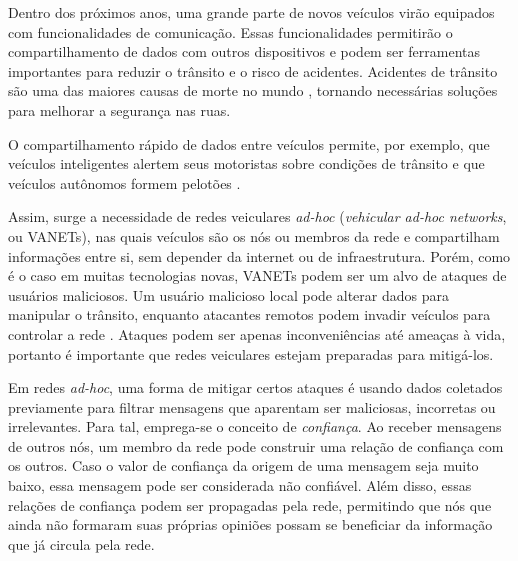 \begin{resumoextendido}
%	
%	
	
	Dentro dos próximos anos, uma grande parte de novos veículos virão equipados com funcionalidades de comunicação.
	Essas funcionalidades permitirão o compartilhamento de dados com outros dispositivos e podem ser ferramentas importantes para reduzir o trânsito e o risco de acidentes.
	Acidentes de trânsito são uma das maiores causas de morte no mundo \citep{whofactsheet}, tornando necessárias soluções para melhorar a segurança nas ruas.
	
	O compartilhamento rápido de dados entre veículos permite, por exemplo, que veículos inteligentes alertem seus motoristas sobre condições de trânsito \citep{lee2004collision} e que veículos autônomos formem pelotões \citep{amoozadeh2015platoon}.
	
	Assim, surge a necessidade de redes veiculares \textit{ad-hoc} (\textit{vehicular ad-hoc networks}, ou VANETs), nas quais veículos são os nós ou membros da rede e compartilham informações entre si, sem depender da internet ou de infraestrutura.	
	Porém, como é o caso em muitas tecnologias novas, VANETs podem ser um alvo de ataques de usuários maliciosos.
	Um usuário malicioso local pode alterar dados para manipular o trânsito, enquanto atacantes remotos podem invadir veículos para controlar a rede \citep{garip2015congestion}.
	Ataques podem ser apenas inconveniências até ameaças à vida, portanto é importante que redes veiculares estejam preparadas para mitigá-los.

	Em redes \textit{ad-hoc}, uma forma de mitigar certos ataques é usando dados coletados previamente para filtrar mensagens que aparentam ser maliciosas, incorretas ou irrelevantes.
	Para tal, emprega-se o conceito de \textit{confiança}.
	Ao receber mensagens de outros nós, um membro da rede pode construir uma relação de confiança com os outros.	
	Caso o valor de confiança da origem de uma mensagem seja muito baixo, essa mensagem pode ser considerada não confiável.
	Além disso, essas relações de confiança podem ser propagadas pela rede, permitindo que nós que ainda não formaram suas próprias opiniões possam se beneficiar da informação que já circula pela rede.


\end{resumoextendido}
